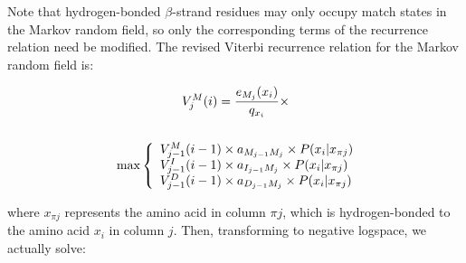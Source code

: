 \documentclass{acm_proc_article-sp}
\begin{document}
Note that hydrogen-bonded $\beta$-strand residues may only occupy match states 
in the Markov random field, so only the corresponding terms of the recurrence
relation need be modified.
The revised Viterbi recurrence relation for the Markov random field is:
\begin{small}
\begin{multline}
V_{j}^{M}(i) = \frac{e_{M_{j}}(x_{i})}{q_{x_{i}}} \times \notag
\\\notag\\ \max \left\{
  \begin{array}{l@{}c@{}l}
  V_{j-1}^{M}(i - 1) \times a_{M_{j-1}M_{j}} \times P(x_{i}|x_{\pi j})\\
  V_{j-1}^{I}(i - 1) \times a_{I_{j-1}M_{j}} \times P(x_{i}|x_{\pi j})\\
  V_{j-1}^{D}(i - 1) \times a_{D_{j-1}M_{j}} \times P(x_{i}|x_{\pi j})\\
  \end{array} \right.\\
\end{multline}
\end{small}
where $x_{\pi j}$ represents the amino acid in column $\pi j$, which is 
hydrogen-bonded to the amino acid $x_{i}$ in column $j$. Then, transforming
to negative logspace, we actually solve: 
\end{document}
